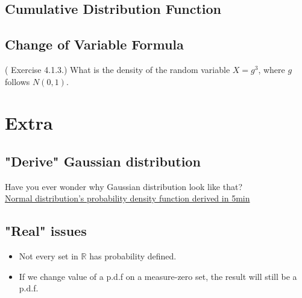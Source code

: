 \subsection{Cumulative Distribution Function}
\subsection{Change of Variable Formula}

\begin{eg}
    (\cite{IntroPanchenko} Exercise 4.1.3.) What is the density of the random variable \(X = g^3\), where \(g\) follows \(N(0,1)\).
\end{eg}
\section{Extra}
\subsection*{"Derive" Gaussian distribution}
Have you ever wonder why Gaussian distribution look like that? \\
\href{https://youtu.be/ebewBjZmZTw}{Normal distribution's probability density function derived in 5min}

\subsection*{"Real" issues}
\begin{itemize}
    \item Not every set in \(\mathbb{R}\) has probability defined. 
    \item If we change value of a p.d.f on a measure-zero set, the result will still be a p.d.f.    
\end{itemize}
